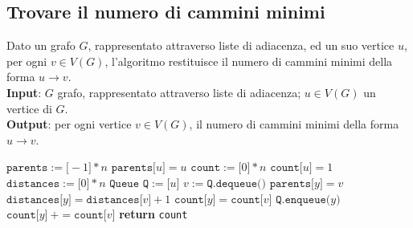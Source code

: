 \documentclass[a4paper, 12pt]{report}
\begin{document}
    \subsection{Trovare il numero di cammini minimi}

    \begin{algorithm}[H]
        \caption{
            Dato un grafo $G$, rappresentato attraverso liste di adiacenza, ed un suo vertice $u$, per ogni $v \in V(G)$, l'algoritmo restituisce il numero di cammini minimi della forma $u \rightarrow v$.\\
            \textbf{Input}: $G$ grafo, rappresentato attraverso liste di adiacenza; $u \in V(G)$ un vertice di $G$.\\
            \textbf{Output}: per ogni vertice $v \in V(G)$, il numero di cammini minimi della forma $u \rightarrow v$.
        }

        \begin{algorithmic}[1]
                \State $\texttt{parents}:=\texttt{[}-1\texttt{]} * n$
                \State $\texttt{parents[}u\texttt{]} = u$
                \State $\texttt{count}:=\texttt{[}0\texttt{]} * n$
                \State $\texttt{count[}u\texttt{]}= 1$ 
                \State $\texttt{distances}:=\texttt{[}0\texttt{]} * n$
                \State $\texttt{Queue Q} := \texttt{[}u\texttt{]}$
                    \State $v := \texttt{Q.dequeue()}$
                         
                            \State $\texttt{parents[}y\texttt{]} = v$
                            \State $\texttt{distances[}y\texttt{]}=\texttt{distances[}v\texttt{]} + 1$
                            \State $\texttt{count[}y\texttt{]}=\texttt{count[}v\texttt{]}$
                            \State $\texttt{Q.enqueue(}y\texttt{)}$
                            \State $\texttt{count[}y\texttt{]} \ += \texttt{count[}v\texttt{]}$
                        \EndIf
                    \EndFor
                \EndWhile
                \State \textbf{return} \texttt{count}
            \EndFunction
        \end{algorithmic}
    \end{algorithm}
\end{document}
